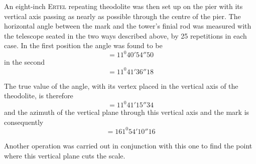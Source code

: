 An eight-inch \textsc{Ertel} repeating theodolite was then set up on the pier with its vertical axis passing as nearly as possible through the centre of the pier. The horizontal angle between the mark and the tower’s finial rod was measured with the telescope seated in the two ways described above, by 25 repetitions in each case. In the first position the angle was found to be
\[
=11^0 40'54''50
\]
in the second
\[
=11^0 41'36''18
\]

The true value of the angle, with its vertex placed in the vertical axis of the theodolite, is therefore
\[
=11^0 41'15''34
\]
and the azimuth of the vertical plane through this vertical axis and the mark is consequently
\[
=161^0 54'10''16
\]

Another operation was carried out in conjunction with this one to find the point where this vertical plane cuts the scale.

